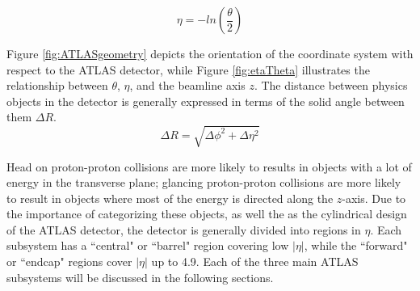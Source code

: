 \begin{equation}
	\eta = -ln(\frac{\theta}{2})
\end{equation}

Figure \ref{fig:ATLASgeometry} depicts the orientation of the coordinate system with respect to the ATLAS detector, while Figure \ref{fig:etaTheta} illustrates the relationship between $\theta$, $\eta$, and the beamline axis $z$. The distance between physics objects in the detector is generally expressed in terms of the solid angle between them $\Delta R$.\\

\begin{equation}
	\Delta R = \sqrt{\Delta\phi^2 + \Delta\eta^2}
\end{equation}

Head on proton-proton collisions are more likely to results in objects with a lot of energy in the transverse plane; glancing proton-proton collisions are more likely to result in objects where most of the energy is directed along the $z$-axis. Due to the importance of categorizing these objects, as well the as the cylindrical design of the ATLAS detector, the detector is generally divided into regions in $\eta$. Each subsystem has a ``central" or ``barrel" region covering low $|\eta|$, while the ``forward" or ``endcap" regions cover $|\eta|$ up to 4.9. Each of the three main ATLAS subsystems will be discussed in the following sections.

